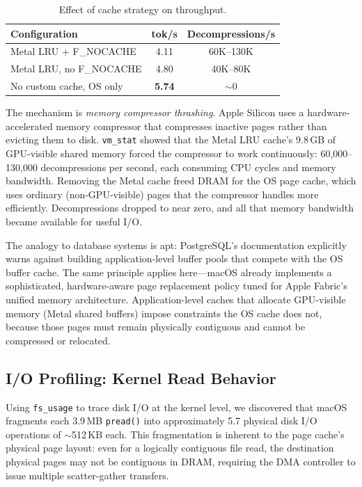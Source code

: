 \documentclass[11pt,twocolumn]{article}
\begin{document}
\begin{table}[t]
\centering
\small
\caption{Effect of cache strategy on throughput.}
\label{tab:trust_os}
\begin{tabular}{@{}lcc@{}}
\toprule
\textbf{Configuration} & \textbf{tok/s} & \textbf{Decompressions/s} \\
\midrule
Metal LRU + F\_NOCACHE & 4.11 & 60K--130K \\
Metal LRU, no F\_NOCACHE & 4.80 & 40K--80K \\
No custom cache, OS only & \textbf{5.74} & $\sim$0 \\
\bottomrule
\end{tabular}
\end{table}

The mechanism is \emph{memory compressor thrashing}.
Apple Silicon uses a hardware-accelerated memory compressor that compresses inactive pages rather than evicting them to disk.
\texttt{vm\_stat} showed that the Metal LRU cache's 9.8\,GB of GPU-visible shared memory forced the compressor to work continuously: 60,000--130,000 decompressions per second, each consuming CPU cycles and memory bandwidth.
Removing the Metal cache freed DRAM for the OS page cache, which uses ordinary (non-GPU-visible) pages that the compressor handles more efficiently.
Decompressions dropped to near zero, and all that memory bandwidth became available for useful I/O.

The analogy to database systems is apt: PostgreSQL's documentation explicitly warns against building application-level buffer pools that compete with the OS buffer cache.
The same principle applies here---macOS already implements a sophisticated, hardware-aware page replacement policy tuned for Apple Fabric's unified memory architecture.
Application-level caches that allocate GPU-visible memory (Metal shared buffers) impose constraints the OS cache does not, because those pages must remain physically contiguous and cannot be compressed or relocated.

\subsection{I/O Profiling: Kernel Read Behavior}
\label{sec:io_profiling}

Using \texttt{fs\_usage} to trace disk I/O at the kernel level, we discovered that macOS fragments each 3.9\,MB \texttt{pread()} into approximately 5.7 physical disk I/O operations of $\sim$512\,KB each.
This fragmentation is inherent to the page cache's physical page layout: even for a logically contiguous file read, the destination physical pages may not be contiguous in DRAM, requiring the DMA controller to issue multiple scatter-gather transfers.
\end{document}
